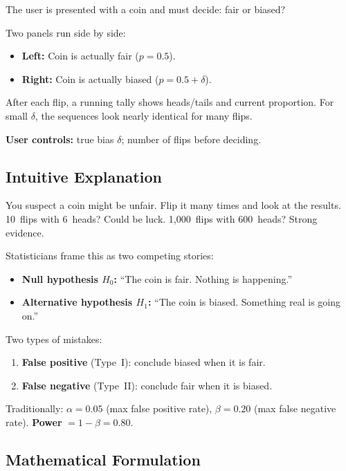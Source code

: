 \documentclass[12pt, a4paper]{article}
\begin{document}
\begin{simulation}
The user is presented with a coin and must decide: fair or biased?

Two panels run side by side:
\begin{itemize}[nosep]
  \item \textbf{Left:} Coin is actually fair ($p=0.5$).
  \item \textbf{Right:} Coin is actually biased ($p=0.5+\delta$).
\end{itemize}
After each flip, a running tally shows heads/tails and current proportion.
For small $\delta$, the sequences look nearly identical for many flips.

\textbf{User controls:} true bias $\delta$; number of flips before deciding.
\end{simulation}

\subsection{Intuitive Explanation}

\begin{intuition}
You suspect a coin might be unfair.  Flip it many times and look at the
results.  10~flips with 6~heads?  Could be luck.  1,000~flips with 600~heads?
Strong evidence.

Statisticians frame this as two competing stories:
\begin{itemize}[nosep]
  \item \textbf{Null hypothesis $H_0$:} ``The coin is fair.  Nothing is happening.''
  \item \textbf{Alternative hypothesis $H_1$:} ``The coin is biased.  Something real is going on.''
\end{itemize}

Two types of mistakes:
\begin{enumerate}[nosep]
  \item \textbf{False positive} (Type~I): conclude biased when it is fair.
  \item \textbf{False negative} (Type~II): conclude fair when it is biased.
\end{enumerate}
Traditionally: $\alpha = 0.05$ (max false positive rate),
$\beta = 0.20$ (max false negative rate).
\textbf{Power} $= 1 - \beta = 0.80$.
\end{intuition}

\subsection{Mathematical Formulation}
\end{document}
